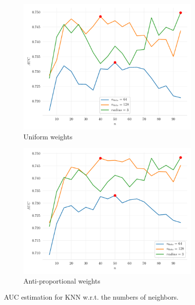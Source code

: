 \begin{figure}[h]
    \begin{subfigure}{0.49\textwidth}
        \centering
        \includegraphics[width=\textwidth]{resources/pdf/knn-default-weight.pdf}
        \caption{Uniform weights}
    \end{subfigure}
    \begin{subfigure}{0.49\textwidth}
        \centering
        \includegraphics[width=\textwidth]{resources/pdf/knn-distance-weight.pdf}
        \caption{Anti-proportional weights}
    \end{subfigure}
    \caption{AUC estimation for KNN w.r.t. the numbers of neighbors.}
    \label{fig:knn_weight}
\end{figure}

